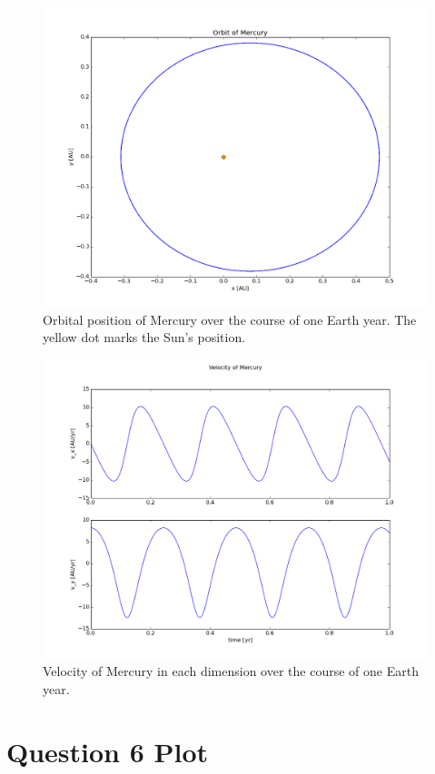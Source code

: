 \documentclass[a4paper,12pt]{article}
\begin{document}
\begin{figure}[H]
\centering
\includegraphics[width = \linewidth]{lab1q5p1.png}
\caption{Orbital position of Mercury over the course of one Earth year. The yellow dot marks the Sun's position.}
\label{fig:q5p1}
\end{figure}

\begin{figure}[H]
\centering
\includegraphics[width = \linewidth]{lab1q5p2.png}
\caption{Velocity of Mercury in each dimension over the course of one Earth year.}
\label{fig:q5p2}
\end{figure}

\section{Question 6 Plot}
\end{document}

